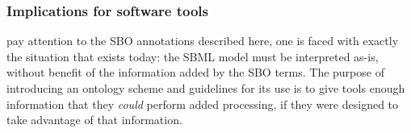\subsubsection{Implications for software tools}

 pay attention to the SBO
annotations described here, one is faced with exactly the
situation that exists today: the SBML model must be interpreted
as-is, without benefit of the information added by the SBO terms.
The purpose of introducing an ontology scheme and guidelines for
its use is to give tools enough information that they \emph{could}
perform added processing, if they were designed to take advantage
of that information.
% 
% 
% 
